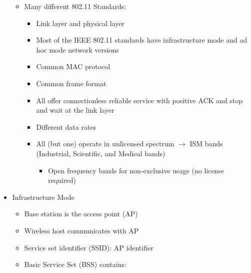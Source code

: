 \begin{itemize}
    \begin{itemize}

      \item Many different 802.11 Standards:

        \begin{itemize}

          \item Link layer and physical layer

          \item Most of the IEEE 802.11 standards have infrastructure mode and ad hoc mode network versions

          \item Common MAC protocol

          \item Common frame format

          \item All offer connectionless reliable service with positive ACK and stop and wait at the link layer

          \item Different data rates

          \item All (but one) operate in unlicensed spectrum $\to$ ISM bands (Industrial, Scientific, and Medical bands)

            \begin{itemize}

              \item Open frequency bands for non-exclusive usage (no license required)

            \end{itemize}

        \end{itemize}

    \end{itemize}

  \item Infrastructure Mode

    \begin{itemize}

      \item Base station is the access point (AP)

      \item Wireless host communicates with AP

      \item Service set identifier (SSID): AP identifier

      \item Basic Service Set (BSS) contains:


\end{itemize}
\end{itemize}
